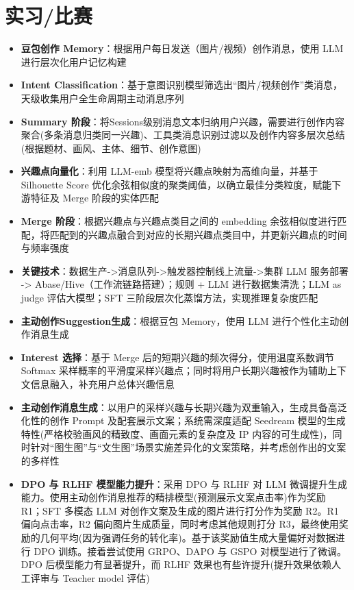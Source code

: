 \documentclass{resume}
\begin{document}
\section{实习/比赛}
\begin{itemize}
    \item[1.] \textbf{豆包创作 Memory}：根据用户每日发送（图片/视频）创作消息，使用 LLM 进行层次化用户记忆构建
        \item \textbf{Intent Classification}：基于意图识别模型筛选出“图片/视频创作”类消息，天级收集用户全生命周期主动消息序列
        \item \textbf{Summary 阶段}：将Sessions级别消息文本归纳用户兴趣，需要进行创作内容聚合(多条消息归类同一兴趣)、工具类消息识别过滤以及创作内容多层次总结(根据题材、画风、主体、细节、创作意图)
        \item \textbf{兴趣点向量化}：利用 LLM-emb 模型将兴趣点映射为高维向量，并基于 Silhouette Score 优化余弦相似度的聚类阈值，以确立最佳分类粒度，赋能下游特征及 Merge 阶段的实体匹配
        \item \textbf{Merge 阶段}：根据兴趣点与兴趣点类目之间的 embedding 余弦相似度进行匹配，将匹配到的兴趣点融合到对应的长期兴趣点类目中，并更新兴趣点的时间与频率强度
        \item  \textbf{关键技术}：数据生产->消息队列->触发器控制线上流量->集群 LLM 服务部署 -> Abase/Hive（工作流链路搭建）；规则 + LLM 进行数据集清洗；LLM as judge 评估大模型；SFT 三阶段层次化蒸馏方法，实现推理复杂度匹配
    \item[2.] \textbf{主动创作Suggestion生成}：根据豆包 Memory，使用 LLM 进行个性化主动创作消息生成
        \item \textbf{Interest 选择}：基于 Merge 后的短期兴趣的频次得分，使用温度系数调节 Softmax 采样概率的平滑度采样兴趣点；同时将用户长期兴趣被作为辅助上下文信息融入，补充用户总体兴趣信息    
        \item \textbf{主动创作消息生成}：以用户的采样兴趣与长期兴趣为双重输入，生成具备高泛化性的创作 Prompt 及配套展示文案；系统需深度适配 Seedream 模型的生成特性(严格校验画风的精致度、画面元素的复杂度及 IP 内容的可生成性)，同时针对“图生图”与“文生图”场景实施差异化的文案策略，并考虑创作出的文案的多样性
        \item \textbf{DPO 与 RLHF 模型能力提升}：采用 DPO 与 RLHF 对 LLM 微调提升生成能力。使用主动创作消息推荐的精排模型(预测展示文案点击率)作为奖励 R1；SFT 多模态 LLM 对创作文案及生成的图片进行打分作为奖励 R2。R1 偏向点击率，R2 偏向图片生成质量，同时考虑其他规则打分 R3，最终使用奖励的几何平均(因为强调任务的转化率)。基于该奖励值生成大量偏好对数据进行 DPO 训练。接着尝试使用 GRPO、DAPO 与 GSPO 对模型进行了微调。DPO 后模型能力有显著提升，而 RLHF 效果也有些许提升(提升效果依赖人工评审与 Teacher model 评估)

\end{itemize}
\end{document}
